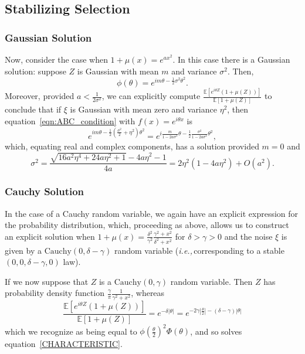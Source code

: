 \documentclass{article}
\newcommand{\ie}{\textit{i.e.,}\,}
\theoremstyle{remark}
\theoremstyle{definition}
\begin{document}
\subsection{Stabilizing Selection}
    \label{sec:stabilizing_selection}

\subsubsection{Gaussian Solution}
    \label{sec:stabilizing_gaussian}

Now, consider the case when $1+ \mu(x) = e^{a x^{2}}$. 
In this case there is a Gaussian solution: suppose $Z$ is Gaussian with mean $m$ and variance $\sigma^{2}$.  Then,
\[
	\phi(\theta) = e^{i m \theta - \frac{1}{2} \sigma^{2} \theta^{2}}.
\]
Moreover, provided $a < \frac{1}{2\sigma^{2}}$, we can explicitly compute $\frac{\mathbb{E}\left[e^{i \theta Z}(1+\mu(Z))\right]}{\mathbb{E}[1+\mu(Z)]}$  to conclude that
if $\xi$ is Gaussian with mean zero and variance $\eta^2$,
then equation~\eqref{eqn:ABC_condition} with $f(x)=e^{i\theta x}$ is
\[
	e^{i m \theta - \frac{1}{2} \left(\frac{\sigma^{2}}{2} + \eta^{2}\right)\theta^{2}}
	= e^{i \frac{m}{1-2 a \sigma^{2}}\theta 
		- \frac{1}{2} \frac{\sigma^{2}}{1-2 a \sigma^{2}}\theta^{2}},
\]
which, equating real and complex components, has a solution provided $m = 0$ and
\[
	\sigma^{2} = \frac{\sqrt{16 a^{2} \eta^{4} + 24 a \eta^{2}+1} - 4a \eta^{2} -1}{4a} 
	=  2\eta^{2}(1-4a\eta^{2}) + O(a^{2}).
\]

\subsubsection{Cauchy Solution}
    \label{sec:stabilizing_cauchy}

In the case of a Cauchy random variable, we again have an explicit expression for the probability distribution, which, proceeding as above, allows us to construct an explicit solution when $1+ \mu(x) = \frac{\delta^{2}}{\gamma^{2}} \frac{\gamma^{2} + x^{2}}{\delta^{2} + x^{2}}$ for $\delta > \gamma > 0$ and the noise $\xi$ is given by a $\text{Cauchy}(0,\delta-\gamma)$ random variable (\ie corresponding to a stable $(0,0,\delta-\gamma,0)$ law).

If we now suppose that $Z$ is a $\text{Cauchy}(0,\gamma)$ random variable.  Then $Z$ has probability density function $\frac{\gamma}{\pi} \frac{1}{\gamma^{2} + x^{2}}$, whereas 
\[
	\frac{\mathbb{E}\left[e^{i \theta Z}(1+\mu(Z))\right]}{\mathbb{E}[1+\mu(Z)]}
	= e^{-\delta |\theta|} = e^{-2\gamma \left|\frac{\theta}{2}\right|-(\delta-\gamma)|\theta|}
\]
which we recognize as being equal to $\phi\left(\frac{\theta}{2}\right)^{2} \Phi(\theta)$,
and so solves equation~\eqref{CHARACTERISTIC}.
\end{document}

